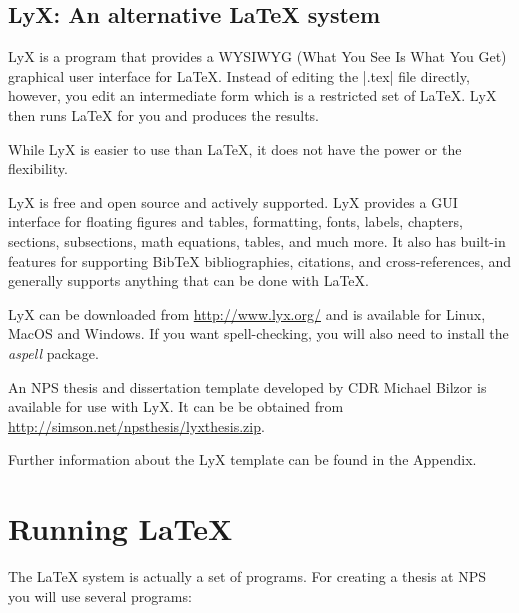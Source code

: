 \subsection{LyX: An alternative \LaTeX{} system}

LyX is a program that provides a WYSIWYG (What You See Is What
  You Get) graphical user interface for \LaTeX. Instead of editing the
|.tex| file directly, however, you edit an intermediate form which is
a restricted set of \LaTeX. LyX then runs \LaTeX{} for you and
produces the results.

While LyX is easier to use than \LaTeX, it does not have the power or
the flexibility.

LyX is free and open source and actively supported. LyX provides a GUI interface for floating figures and tables,
formatting, fonts, labels, chapters, sections, subsections, math
equations, tables, and much more.  It also has built-in features for
supporting Bib\TeX{} bibliographies, citations, and cross-references,
and generally supports anything that can be done with \LaTeX{}.

LyX can be downloaded from  \url{http://www.lyx.org/} and is available
for Linux, MacOS and Windows.  If you want spell-checking, you will
also need to install the \emph{aspell} package. 

An NPS thesis and dissertation template developed by CDR Michael
Bilzor is available for use with LyX. It can be be obtained from
\url{http://simson.net/npsthesis/lyxthesis.zip}.  

Further information about the LyX template can be found in the Appendix.


\section{Running \LaTeX}\label{runninglatex}
The \LaTeX{} system is actually a set of programs. For creating a thesis at NPS you will use several programs:


